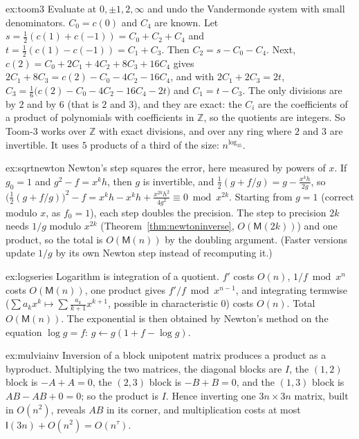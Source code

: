 \begin{solution}{ex:toom3}
\idea Evaluate at $0,\pm1,2,\infty$ and undo the Vandermonde system with small denominators.
\writeup $C_0=c(0)$ and $C_4$ are known. Let $s=\frac12(c(1)+c(-1))=C_0+C_2+C_4$ and $t=\frac12(c(1)-c(-1))=C_1+C_3$. Then $C_2=s-C_0-C_4$. Next, $c(2)=C_0+2C_1+4C_2+8C_3+16C_4$ gives $2C_1+8C_3=c(2)-C_0-4C_2-16C_4$, and with $2C_1+2C_3=2t$, $C_3=\frac16\bigl(c(2)-C_0-4C_2-16C_4-2t\bigr)$ and $C_1=t-C_3$.
The only divisions are by $2$ and by $6$ (that is $2$ and $3$), and they are exact: the $C_i$ are the coefficients of a product of polynomials with coefficients in $\mathbb Z$, so the quotients are integers. So Toom-$3$ works over $\mathbb Z$ with exact divisions, and over any ring where $2$ and $3$ are invertible. It uses $5$ products of a third of the size: $n^{\log_35}$.
\end{solution}

\begin{solution}{ex:sqrtnewton}
\idea Newton's step squares the error, here measured by powers of $x$.
\writeup If $g_0=1$ and $g^2-f=x^kh$, then $g$ is invertible, and $\frac12(g+f/g)=g-\frac{x^kh}{2g}$, so
$\bigl(\frac12(g+f/g)\bigr)^2-f=x^kh-x^kh+\frac{x^{2k}h^2}{4g^2}\equiv0\bmod x^{2k}$. Starting from $g=1$ (correct modulo $x$, as $f_0=1$), each step doubles the precision. The step to precision $2k$ needs $1/g$ modulo $x^{2k}$ (Theorem~\ref{thm:newtoninverse}, $O(\mathsf M(2k))$) and one product, so the total is $O(\mathsf M(n))$ by the doubling argument.
(Faster versions update $1/g$ by its own Newton step instead of recomputing it.)
\end{solution}

\begin{solution}{ex:logseries}
\idea Logarithm is integration of a quotient.
\writeup $f'$ costs $O(n)$, $1/f\bmod x^n$ costs $O(\mathsf M(n))$, one product gives $f'/f\bmod x^{n-1}$, and integrating termwise ($\sum a_kx^k\mapsto\sum\frac{a_k}{k+1}x^{k+1}$, possible in characteristic $0$) costs $O(n)$. Total $O(\mathsf M(n))$. The exponential is then obtained by Newton's method on the equation $\log g=f$: $g\leftarrow g(1+f-\log g)$.
\end{solution}

\begin{solution}{ex:mulviainv}
\idea Inversion of a block unipotent matrix produces a product as a byproduct.
\writeup Multiplying the two matrices, the diagonal blocks are $I$, the $(1,2)$ block is $-A+A=0$, the $(2,3)$ block is $-B+B=0$, and the $(1,3)$ block is $AB-AB+0=0$; so the product is $I$. Hence inverting one $3n\times3n$ matrix, built in $O(n^2)$, reveals $AB$ in its corner, and multiplication costs at most $\mathsf I(3n)+O(n^2)=O(n^\tau)$.
\end{solution}

